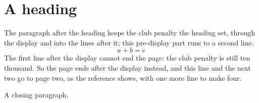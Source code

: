 \documentclass[10pt,twoside]{article}
\begin{document}
\section*{A heading}
The paragraph after the heading keeps the club penalty the heading set, through the display and into the lines after it; this pre-display part runs to a second line.
\begin{equation} a + b = c \end{equation}
The first line after the display cannot end the page: the club penalty is still ten thousand. So the page ends after the display instead, and this line and the next two go to page two, as the reference shows, with one more line to make four.

A closing paragraph.
\end{document}
